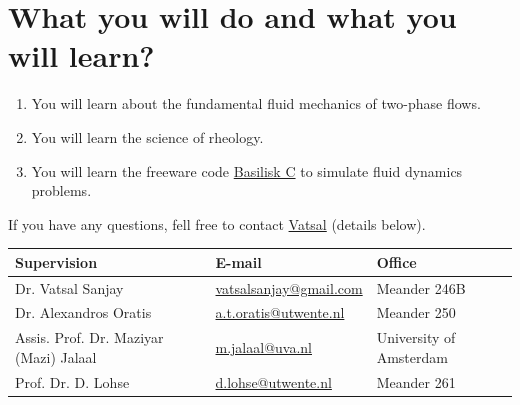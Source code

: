 \documentclass[a4paper,10pt]{article}
\begin{document}
\section*{What you will do and what you will learn?}
\begin{enumerate}
\item You will learn about the fundamental fluid mechanics of two-phase flows.
\item You will learn the science of rheology.
\item You will learn the freeware code \href{http://basilisk.fr}{Basilisk C} to simulate fluid dynamics problems.
\end{enumerate}

If you have any questions, fell free to contact \href{mailto:vatsalsanjay@gmail.com}{Vatsal} (details below).
\begin{center}
\begin{tabular}{|l|l|l|}
\hline \textbf{Supervision} & \textbf{E-mail} & \textbf{Office} \\
\hline Dr. Vatsal Sanjay & \href{mailto:vatsalsanjay@gmail.com}{vatsalsanjay@gmail.com} & Meander 246B \\
\hline Dr. Alexandros Oratis   & \href{mailto:a.t.oratis@utwente.nl}{a.t.oratis@utwente.nl}& Meander 250 \\
\hline Assis. Prof. Dr. Maziyar (Mazi) Jalaal   & \href{mailto:m.jalaal@uva.nl}{m.jalaal@uva.nl}& University of Amsterdam \\
\hline Prof. Dr. D. Lohse & \href{mailto:d.lohse@utwente.nl}{d.lohse@utwente.nl} & Meander 261  \\
\hline
\end{tabular}
\end{center}
\printbibliography
\end{document}
